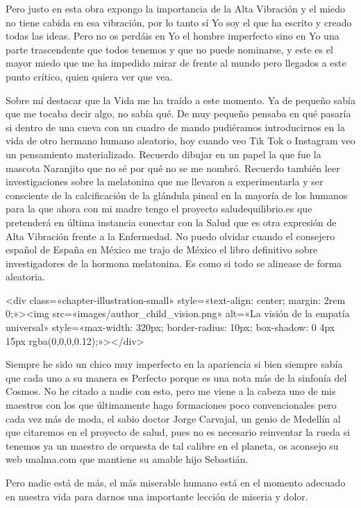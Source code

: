 \documentclass[11pt,a5paper]{book}
\begin{document}
Pero justo en esta obra expongo la importancia de la Alta Vibración y el miedo no tiene cabida en esa vibración, por lo tanto sí Yo soy el que ha escrito y creado todas las ideas. Pero no os perdáis en Yo el hombre imperfecto sino en Yo una parte trascendente que todos tenemos y que no puede nominarse, y este es el mayor miedo que me ha impedido mirar de frente al mundo pero llegados a este punto crítico, quien quiera ver que vea.

Sobre mí destacar que la Vida me ha traído a este momento. Ya de pequeño sabía que me tocaba decir algo, no sabía qué. De muy pequeño pensaba en qué pasaría si dentro de una cueva con un cuadro de mando pudiéramos introducirnos en la vida de otro hermano humano aleatorio, hoy cuando veo Tik Tok o Instagram veo un pensamiento materializado. Recuerdo dibujar en un papel la que fue la mascota Naranjito que no sé por qué no se me nombró. Recuerdo también leer investigaciones sobre la melatonina que me llevaron a experimentarla y ser consciente de la calcificación de la glándula pineal en la mayoría de los humanos para la que ahora con mi madre tengo el proyecto saludequilibrio.es que pretenderá en última instancia conectar con la Salud que es otra expresión de Alta Vibración frente a la Enfermedad. No puedo olvidar cuando el consejero español de España en México me trajo de México el libro definitivo sobre investigadores de la hormona melatonina. Es como si todo se alinease de forma aleatoria.

<div class=«chapter-illustration-small» style=«text-align: center; margin: 2rem 0;»><img src=«images/author_child_vision.png» alt=«La visión de la empatía universal» style=«max-width: 320px; border-radius: 10px; box-shadow: 0 4px 15px rgba(0,0,0,0.12);»></div>

Siempre he sido un chico muy imperfecto en la apariencia si bien siempre sabía que cada uno a su manera es Perfecto porque es una nota más de la sinfonía del Cosmos. No he citado a nadie con esto, pero me viene a la cabeza uno de mis maestros con los que últimamente hago formaciones poco convencionales pero cada vez más de moda, el sabio doctor Jorge Carvajal, un genio de Medellín al que citaremos en el proyecto de salud, pues no es necesario reinventar la rueda si tenemos ya un maestro de orquesta de tal calibre en el planeta, os aconsejo su web unalma.com que mantiene su amable hijo Sebastián. 

Pero nadie está de más, el más miserable humano está en el momento adecuado en nuestra vida para darnos una importante lección de miseria y dolor. 
\end{document}
